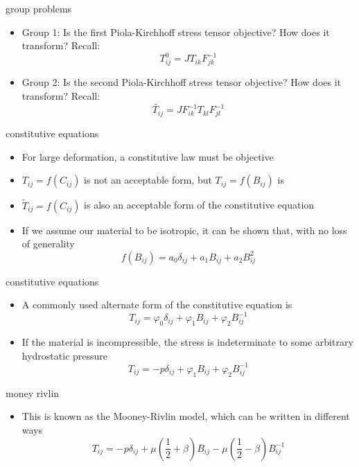 \documentclass[
  letterpaper,
  ignorenonframetext,
  aspectratio=43,
  handout,
  12pt]{beamer}
\providecommand{\tightlist}{%
  \setlength{\itemsep}{0pt}\setlength{\parskip}{0pt}}
\providecommand{\tightlist}{%
\setlength{\itemsep}{0pt}\setlength{\parskip}{0pt}}
\begin{document}
\begin{frame}{group problems}
\protect\hypertarget{group-problems}{}
\begin{itemize}
\tightlist
\item
  Group 1: Is the first Piola-Kirchhoff stress tensor objective? How
  does it transform? Recall: \[T_{ij}^0 = J T_{ik} F_{jk}^{-1}\]
\item
  Group 2: Is the second Piola-Kirchhoff stress tensor objective? How
  does it transform? Recall:
  \[\tilde{T_{ij}} = J F_{ik}^{-1} T_{kl} F_{jl}^{-1}\]
\end{itemize}
\end{frame}

\begin{frame}{constitutive equations}
\protect\hypertarget{constitutive-equations}{}
\begin{itemize}
\tightlist
\item
  For large deformation, a constitutive law must be objective
\item
  \(T_{ij} = f(C_{ij})\) is not an acceptable form, but
  \(T_{ij} = f(B_{ij})\) is
\item
  \(\tilde{T}_{ij} = f(C_{ij})\) is also an acceptable form of the
  constitutive equation
\item
  If we assume our material to be isotropic, it can be shown that, with
  no loss of generality
  \[f(B_{ij}) = a_0 \delta_{ij} + a_1 B_{ij} + a_2 B_{ij}^2\]
\end{itemize}
\end{frame}

\begin{frame}{constitutive equations}
\protect\hypertarget{constitutive-equations-1}{}
\begin{itemize}
\item
  A commonly used alternate form of the constitutive equation is
  \[T_{ij} = \varphi_0 \delta_{ij} + \varphi_1 B_{ij} + \varphi_2 B_{ij}^{-1}\]
\item
  If the material is incompressible, the stress is indeterminate to some
  arbitrary hydrostatic pressure
  \[T_{ij} = -p \delta_{ij} + \varphi_1 B_{ij} + \varphi_2 B_{ij}^{-1}\]
\end{itemize}
\end{frame}

\begin{frame}{money rivlin}
\protect\hypertarget{money-rivlin}{}
\begin{itemize}
\tightlist
\item
  This is known as the Mooney-Rivlin model, which can be written in
  different ways
  \[T_{ij} = -p \delta_{ij} + \mu \left(\frac{1}{2} + \beta\right) B_{ij} - \mu \left(\frac{1}{2} - \beta\right) B_{ij}^{-1}\]
\end{itemize}
\end{frame}
\end{document}
